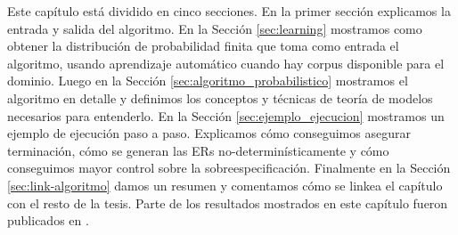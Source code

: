 Este cap\'itulo est\'a dividido en cinco secciones. En la primer secci\'on explicamos la entrada y salida del algoritmo. En la Secci\'on \ref{sec:learning} mostramos como obtener la distribuci\'on de probabilidad finita que toma como entrada el algoritmo, usando aprendizaje autom\'atico cuando hay corpus disponible para el dominio. Luego en la Secci\'on \ref{sec:algoritmo_probabilistico} mostramos el algoritmo en detalle y definimos los conceptos y t\'ecnicas de teor\'ia de modelos necesarios para entenderlo. En la Secci\'on \ref{sec:ejemplo_ejecucion} mostramos un ejemplo de ejecuci\'on paso a paso. Explicamos c\'omo conseguimos asegurar terminaci\'on, c\'omo se generan las ERs no-determin\'isticamente y c\'omo conseguimos mayor control sobre la sobreespecificaci\'on. Finalmente en la Secci\'on \ref{sec:link-algoritmo} damos un resumen y comentamos c\'omo se linkea el cap\'itulo con el resto de la tesis. Parte de los resultados mostrados en este cap\'itulo fueron publicados en \cite{arec:2012:coling12}.

